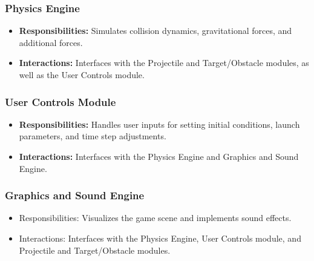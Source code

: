 \documentclass[12pt, titlepage]{article}
\begin{document}
\subsubsection{Physics Engine}
\begin{itemize}
  \item \textbf{Responsibilities:} Simulates collision dynamics, gravitational forces, and additional forces.
  \item \textbf{Interactions:} Interfaces with the Projectile and Target/Obstacle modules, as well as the User Controls module.
\end{itemize}

\subsubsection{User Controls Module}
\begin{itemize}
  \item \textbf{Responsibilities:} Handles user inputs for setting initial conditions, launch parameters, and time step adjustments.
  \item \textbf{Interactions:} Interfaces with the Physics Engine and Graphics and Sound Engine.
\end{itemize}

\subsubsection{Graphics and Sound Engine}
\begin{itemize}
  \item Responsibilities: Visualizes the game scene and implements sound effects.
  \item Interactions: Interfaces with the Physics Engine, User Controls module, and Projectile and Target/Obstacle modules.
\end{itemize}
\end{document}

